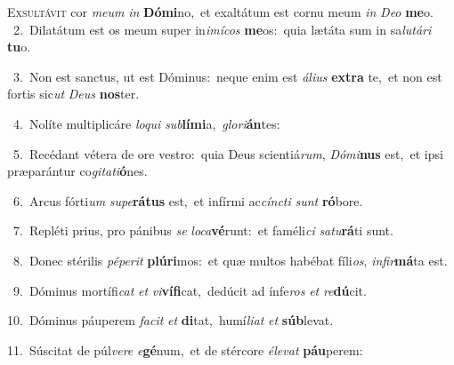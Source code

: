\lettrine{\initial\textcolor{\initialcolor}{E}}{xsultávit} cor \textit{me}\-\textit{um} \textit{in} \textbf{Dó}\-\textbf{mi}no,~\star et exaltátum est cornu meum \textit{in} \textit{De}\-\textit{o} \textbf{me}\-o.\\
{\numbfont\textcolor{\numbcolor}{~2.}}~Dilatátum est os meum super in\-\textit{i}\-\textit{mí}\textit{cos} \textbf{me}\-os:~\star quia lætáta sum in sa\-\textit{lu}\-\textit{tá}\textit{ri} \textbf{tu}\-o.\par
{\numbfont\textcolor{\numbcolor}{~3.}}~Non est sanctus, ut est Dóminus:~\dagger neque enim est \textit{á}\-\textit{li}\textit{us} \textbf{ex}\-\textbf{tra} te,~\star et non est fortis sic\textit{ut} \textit{De}\-\textit{us} \textbf{nos}\-ter.\par
{\numbfont\textcolor{\numbcolor}{~4.}}~Nolíte multiplicáre \textit{lo}\-\textit{qui} \textit{sub}\-\textbf{lí}\textbf{mi}a,~\star \textit{glo}\-\textit{ri}\textbf{án}tes:\par
{\numbfont\textcolor{\numbcolor}{~5.}}~Recédant vétera de ore vestro:~\dagger quia Deus scientiá\-\textit{rum}\-, \textit{Dó}\-\textit{mi}\textbf{nus} est,~\star et ipsi præparántur co\-\textit{gi}\-\textit{ta}\textit{ti}\textbf{ó}nes.\par
{\numbfont\textcolor{\numbcolor}{~6.}}~Arcus fórti\textit{um} \textit{su}\-\textit{pe}\textbf{rá}\textbf{tus} est,~\star et infírmi ac\-\textit{cínc}\-\textit{ti} \textit{sunt} \textbf{ró}\-bore.\par
{\numbfont\textcolor{\numbcolor}{~7.}}~Repléti prius, pro pánibus \textit{se} \textit{lo}\-\textit{ca}\textbf{vé}runt:~\star et faméli\textit{ci} \textit{sa}\-\textit{tu}\textbf{rá}ti sunt.\par
{\numbfont\textcolor{\numbcolor}{~8.}}~Donec stérilis \textit{pé}\-\textit{pe}\textit{rit} \textbf{plú}\-\textbf{ri}mos:~\star et quæ multos habébat fíli\-\textit{os}\-, \textit{in}\-\textit{fir}\textbf{má}ta est.\par
{\numbfont\textcolor{\numbcolor}{~9.}}~Dóminus mortífi\textit{cat} \textit{et} \textit{vi}\-\textbf{ví}\textbf{fi}cat,~\star dedúcit ad ínfe\textit{ros} \textit{et} \textit{re}\-\textbf{dú}cit.\par
{\numbfont\textcolor{\numbcolor}{10.}}~Dóminus páuperem \textit{fa}\-\textit{cit} \textit{et} \textbf{di}\-tat,~\star humí\-\textit{li}\-\textit{at} \textit{et} \textbf{súb}\-levat.\par
{\numbfont\textcolor{\numbcolor}{11.}}~Súscitat de púl\-\textit{ve}\-\textit{re} \textit{e}\-\textbf{gé}num,~\star et de stércore \textit{é}\-\textit{le}\textit{vat} \textbf{páu}\-perem:\par

